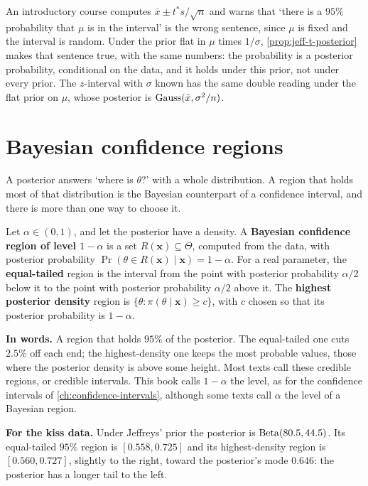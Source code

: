\begin{bridge}
An introductory course computes $\bar{x} \pm t^*s/\sqrt{n}$ and warns that `there is a $95\%$ probability that $\mu$ is in the interval' is the wrong sentence, since $\mu$ is fixed and the interval is random.
Under the prior flat in $\mu$ times $1/\sigma$, \cref{prop:jeff-t-posterior} makes that sentence true, with the same numbers: the probability is a posterior probability, conditional on the data, and it holds under this prior, not under every prior.
The $z$-interval with $\sigma$ known has the same double reading under the flat prior on $\mu$, whose posterior is $\text{Gauss}(\bar{x}, \sigma^2/n)$.
\end{bridge}

\section{Bayesian confidence regions}
\label{sec:jeff-regions}

A posterior answers `where is $\theta$?' with a whole distribution.
A region that holds most of that distribution is the Bayesian counterpart of a confidence interval, and there is more than one way to choose it.

\begin{definition}
\label{def:bayes-region}
Let $\alpha \in (0, 1)$, and let the posterior have a density. A \textbf{Bayesian confidence region of level $1 - \alpha$} is a set $R(\mathbf{x}) \subseteq \Theta$, computed from the data, with posterior probability $\Pr(\theta \in R(\mathbf{x}) \mid \mathbf{x}) = 1 - \alpha$. For a real parameter, the \textbf{equal-tailed} region is the interval from the point with posterior probability $\alpha/2$ below it to the point with posterior probability $\alpha/2$ above it. The \textbf{highest posterior density} region is $\{\theta : \pi(\theta \mid \mathbf{x}) \geq c\}$, with $c$ chosen so that its posterior probability is $1 - \alpha$.
\end{definition}

\begin{inwords}
\textbf{In words.} A region that holds $95\%$ of the posterior. The equal-tailed one cuts $2.5\%$ off each end; the highest-density one keeps the most probable values, those where the posterior density is above some height. Most texts call these credible regions, or credible intervals. This book calls $1 - \alpha$ the level, as for the confidence intervals of \cref{ch:confidence-intervals}, although some texts call $\alpha$ the level of a Bayesian region.
\par\smallskip
\textbf{For the kiss data.} Under Jeffreys' prior the posterior is $\mathrm{Beta}(80.5, 44.5)$. Its equal-tailed $95\%$ region is $[0.558, 0.725]$ and its highest-density region is $[0.560, 0.727]$, slightly to the right, toward the posterior's mode $0.646$: the posterior has a longer tail to the left.
\end{inwords}

